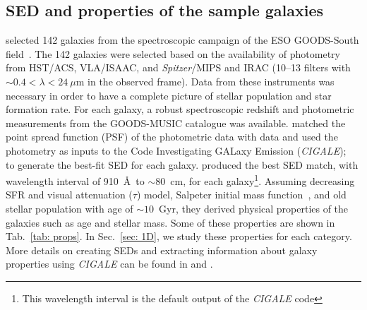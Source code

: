  \subsection{SED and properties of the sample galaxies} 
     selected 142 galaxies from the spectroscopic campaign of the ESO GOODS-South field~\citep{Vanzella05, Vanzella06, Vanzella08}.
    The 142 galaxies were selected based on the availability of photometry from HST/ACS, VLA/ISAAC, and {\it Spitzer}/MIPS and IRAC (10--13 filters with $\sim 0.4<\lambda<24~\mu$m in the observed frame).
   Data from these instruments was necessary in order to have a complete picture of stellar population and star formation rate. 
    For each galaxy, a robust spectroscopic redshift and photometric measurements from the GOODS-MUSIC catalogue \citep{Santini09} was available.
    matched the point spread function (PSF) of the photometric data with  data and used the photometry as inputs to the Code Investigating GALaxy Emission ({\em CIGALE});~\citep[][hereafter N09]{Noll09} to generate the best-fit SED for each galaxy.
     produced the best SED match, with wavelength interval of 910~\AA~to $\sim 80$~cm, for each galaxy\footnote{This wavelength interval is the default output of the {\em CIGALE} code}.
    Assuming decreasing SFR and visual attenuation ($\tau$) model, Salpeter initial mass function~\citep{Salpeter55}, and old stellar population with age of $\sim 10$~Gyr, they derived physical properties of the galaxies such as age and stellar mass.
    Some of these properties are shown in Tab.~\ref{tab: props}.
    In Sec.~\ref{sec: 1D}, we study these properties for each category.
    More details on creating SEDs and extracting information about galaxy properties using {\em CIGALE} can be found in  and .
    
